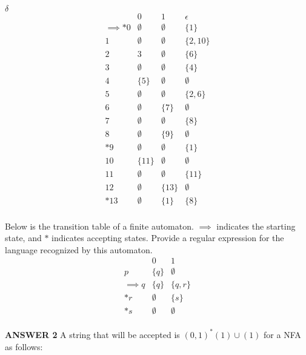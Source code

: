 \documentclass[addpoints]{exam}
\begin{document}
\begin{questions}
\begin{center}
    $\delta$
    \[
  \begin{array}{r|ccc}
    & 0 & 1 & \epsilon\\\hline
    \implies *0 &  \emptyset & \emptyset & \{1\} \\
     1 & \emptyset & \emptyset & \{2,10\}\\
    2 & 3 & \emptyset & \{6\}  \\
    3 & \emptyset & \emptyset & \{4\} \\
    4 & \{5\} & \emptyset & \emptyset  \\
    5 & \emptyset & \emptyset & \{2,6\} \\
    6 & \emptyset & \{7\} & \emptyset  \\
    7 & \emptyset & \emptyset & \{8\} \\
    8 & \emptyset & \{9\} & \emptyset  \\
    *9 & \emptyset & \emptyset & \{1\} \\
    10 & \{11\} & \emptyset & \emptyset  \\
    11 & \emptyset & \emptyset & \{11\} \\
    12 & \emptyset & \{13\} & \emptyset  \\
    *13 & \emptyset & \{1\} & \{8\} \\
    
  \end{array}
  \]
\end{center}

  
\question[5] Below is the transition table of a finite automaton. $\implies$ indicates the starting state, and $*$ indicates accepting states. Provide a regular expression for the language recognized by this automaton.
  \[
  \begin{array}{r|cc}
    & 0 & 1 \\\hline
    p & \{ q \} & \emptyset \\
    \implies q & \{ q \} & \{ q, r \} \\
    *r & \emptyset & \{ s \} \\
    *s & \emptyset & \emptyset \\
  \end{array}
  \]

  \begin{center}
      \textbf{ANSWER 2}
      A string that will be accepted is $(0,1)^*(1)\cup (1)$ for a NFA as follows:
  \end{center}


\end{questions}
\end{document}
